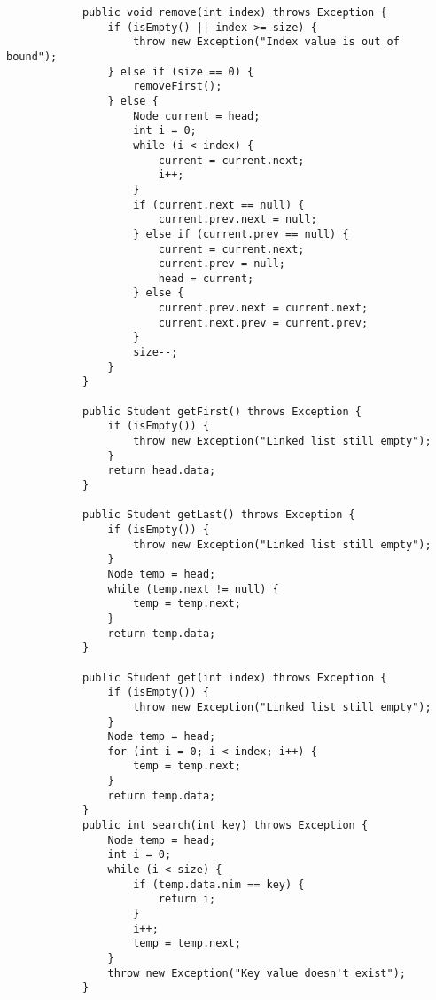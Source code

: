 \documentclass[12pt,titlepage]{article}
\begin{document}
\begin{enumerate}
\begin{verbatim}
            public void remove(int index) throws Exception {
                if (isEmpty() || index >= size) {
                    throw new Exception("Index value is out of bound");
                } else if (size == 0) {
                    removeFirst();
                } else {
                    Node current = head;
                    int i = 0;
                    while (i < index) {
                        current = current.next;
                        i++;
                    }
                    if (current.next == null) {
                        current.prev.next = null;
                    } else if (current.prev == null) {
                        current = current.next;
                        current.prev = null;
                        head = current;
                    } else {
                        current.prev.next = current.next;
                        current.next.prev = current.prev;
                    }
                    size--;
                }
            }

            public Student getFirst() throws Exception {
                if (isEmpty()) {
                    throw new Exception("Linked list still empty");
                }
                return head.data;
            }

            public Student getLast() throws Exception {
                if (isEmpty()) {
                    throw new Exception("Linked list still empty");
                }
                Node temp = head;
                while (temp.next != null) {
                    temp = temp.next;
                }
                return temp.data;
            }

            public Student get(int index) throws Exception {
                if (isEmpty()) {
                    throw new Exception("Linked list still empty");
                }
                Node temp = head;
                for (int i = 0; i < index; i++) {
                    temp = temp.next;
                }
                return temp.data;
            }
            public int search(int key) throws Exception {
                Node temp = head;
                int i = 0;
                while (i < size) {
                    if (temp.data.nim == key) {
                        return i;
                    }
                    i++;
                    temp = temp.next;
                }
                throw new Exception("Key value doesn't exist");
            }


\end{verbatim}
\end{enumerate}
\end{document}
